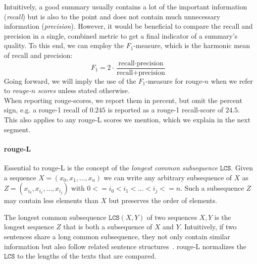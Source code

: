 Intuitively, a good summary usually contains a lot of the important information (\emph{recall})
but is also to the point and does not contain much unnecessary information (\emph{precision}).
However, it would be beneficial to compare the recall and precision in a single, combined metric to get a final indicator of a summary's quality.
To this end, we can employ the \(F_1\)-measure, which is the harmonic mean of recall and precision:
\begin{equation}
F_1 = 2 \cdot \frac{\text{recall} \cdot \text{precision}}{\text{recall} + \text{precision}}
\end{equation}
%
Going forward, we will imply the use of the \(F_1\)-measure for \acs*{rouge}-\(n\)
when we refer to \emph{\acs*{rouge}-\(n\) scores} unless stated otherwise.\\
When reporting \acs*{rouge}-scores, we report them in percent, but omit the percent sign,
e.g. a \acs*{rouge}-1 recall of \(0.245\) is reported as a \acs*{rouge}-1 recall-score of \(24.5\).
This also applies to any \acs*{rouge}-L scores we mention, which we explain in the next segment.

\paragraph{\acs*{rouge}-L}
\newcommand{\lcs}{\ensuremath{\texttt{LCS}}}
Essential to \acs*{rouge}-L is the concept of the \emph{longest common subsequence} \(\lcs\).
Given a sequence \(X = (x_0, x_1, \ldots, x_n)\) we can write any arbitrary subsequence of \(X\) as
\(Z = (x_{i_0}, x_{i_1}, \ldots, x_{i_j})\) with \(0 <= i_0 < i_1 < \ldots < i_j <= n\).
Such a subsequence \(Z\) may contain less elements than \(X\) but preserves the order of elements.

The longest common subsequence \(\lcs(X, Y)\) of two sequences \(X, Y\) is the longest sequence \(Z\) that is both a subsequence of \(X\) and \(Y\).
Intuitively, if two sentences share a long common subsequence, they not only contain similar information
but also follow related sentence structures~\parencite[3]{rouge}.
\acs*{rouge}-L normalizes the \(\lcs\) to the lengths of the texts that are compared.

